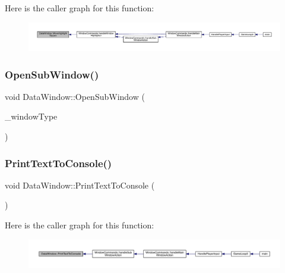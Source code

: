 Here is the caller graph for this function\+:
\nopagebreak
\begin{figure}[H]
\begin{center}
\leavevmode
\includegraphics[width=350pt]{class_data_window_a2047f47dfa6093e3f7c4bf30cd176a46_icgraph}
\end{center}
\end{figure}
\mbox{\label{class_data_window_a3313c90eabd00824c775e3a23e82e3a9}} 
\subsubsection{\texorpdfstring{Open\+Sub\+Window()}{OpenSubWindow()}}
{\footnotesize\ttfamily void Data\+Window\+::\+Open\+Sub\+Window (\begin{DoxyParamCaption}\item[{\mbox{\hyperlink{_data_window_8hpp_a3c1e0c6fe947fdbea7502497b27cf44d}{En\+Data\+Window\+Type}}}]{\+\_\+window\+Type }\end{DoxyParamCaption})}

\mbox{\label{class_data_window_a0092110104aa5506e15ac1dc1d3b0eac}} 
\subsubsection{\texorpdfstring{Print\+Text\+To\+Console()}{PrintTextToConsole()}}
{\footnotesize\ttfamily void Data\+Window\+::\+Print\+Text\+To\+Console (\begin{DoxyParamCaption}{ }\end{DoxyParamCaption})}

Here is the caller graph for this function\+:
\nopagebreak
\begin{figure}[H]
\begin{center}
\leavevmode
\includegraphics[width=350pt]{class_data_window_a0092110104aa5506e15ac1dc1d3b0eac_icgraph}
\end{center}
\end{figure}
\mbox{\label{class_data_window_a66d08b9e2df3b4960fe4e030aabf61be}} 
